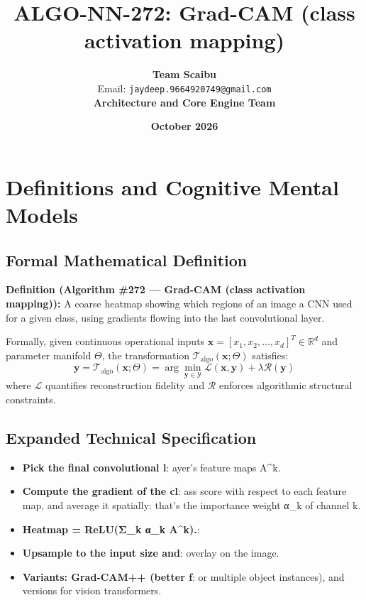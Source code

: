 \documentclass[11pt,a4paper]{article}
\title{\textbf{ALGO-NN-272: Grad-CAM (class activation mapping)}}
\author{\textbf{Team Scaibu} \\ \small Email: \texttt{jaydeep.9664920749@gmail.com} \\ \small \textbf{Architecture and Core Engine Team}}
\date{\textbf{October 2026}}
\theoremstyle{definition}
\begin{document}
\maketitle

\section{Definitions and Cognitive Mental Models}

\subsection{Formal Mathematical Definition}
\textbf{Definition (Algorithm \#272 --- Grad-CAM (class activation mapping)):}
A coarse heatmap showing which regions of an image a CNN used for a given class, using gradients flowing into the last convolutional layer.

Formally, given continuous operational inputs $\mathbf{x} = [x_1, x_2, \dots, x_d]^T \in \mathbb{R}^d$ and parameter manifold $\Theta$, the transformation $\mathcal{T}_{\text{algo}}(\mathbf{x}; \Theta)$ satisfies:
{\boldmath
\begin{equation}
\mathbf{y} = \mathcal{T}_{\text{algo}}(\mathbf{x}; \Theta) = \arg\min_{\mathbf{y} \in \mathcal{Y}} \mathcal{L}(\mathbf{x}, \mathbf{y}) + \lambda \mathcal{R}(\mathbf{y})
\end{equation}
}
where $\mathcal{L}$ quantifies reconstruction fidelity and $\mathcal{R}$ enforces algorithmic structural constraints.

\subsection{Expanded Technical Specification}
\begin{itemize}
\item \textbf{Pick the final convolutional l}: ayer's feature maps A^k.
\item \textbf{Compute the gradient of the cl}: ass score with respect to each feature map, and average it spatially: that's the importance weight α\_k of channel k.
\item \textbf{Heatmap = ReLU(Σ\_k α\_k A^k).}: 
\item \textbf{Upsample to the input size and}:  overlay on the image.
\item \textbf{Variants: Grad-CAM++ (better f}: or multiple object instances), and versions for vision transformers.
\end{itemize}
\end{document}
